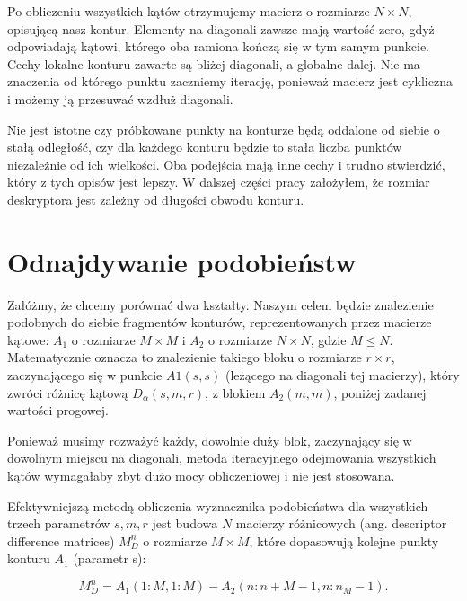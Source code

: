 Po obliczeniu wszystkich kątów otrzymujemy macierz o rozmiarze $N \times N$,
opisującą nasz kontur. Elementy na diagonali zawsze mają wartość zero, gdyż
odpowiadają kątowi, którego oba ramiona kończą się w tym samym punkcie. Cechy
lokalne konturu zawarte są bliżej diagonali, a globalne dalej. Nie ma znaczenia
od którego punktu zaczniemy iterację, ponieważ macierz jest cykliczna i możemy
ją przesuwać wzdłuż diagonali.

Nie jest istotne czy próbkowane punkty na konturze będą oddalone od siebie o
stałą odległość, czy dla każdego konturu będzie to stała liczba punktów
niezależnie od ich wielkości. Oba podejścia mają inne cechy i trudno
stwierdzić, który z tych opisów jest lepszy. W dalszej części pracy założyłem,
że rozmiar deskryptora jest zależny od długości obwodu konturu.


\section{Odnajdywanie podobieństw}

Załóżmy, że chcemy porównać dwa kształty. Naszym celem będzie znalezienie
podobnych do siebie fragmentów konturów, reprezentowanych przez macierze
kątowe: $A_{1}$ o rozmiarze $M \times M$ i $A_{2}$ o rozmiarze $N \times N$,
gdzie $M \leq N$.  Matematycznie oznacza to znalezienie takiego bloku o
rozmiarze $r \times r$, zaczynającego się w punkcie $A1(s,s)$ (leżącego na
diagonali tej macierzy), który zwróci różnicę kątową $D_{\alpha}(s,m,r)$, z
blokiem $A_{2}(m,m)$, poniżej zadanej wartości progowej. 


Ponieważ musimy rozważyć każdy, dowolnie duży blok, zaczynający się w dowolnym
miejscu na diagonali, metoda iteracyjnego odejmowania wszystkich kątów
wymagałaby zbyt dużo mocy obliczeniowej i nie jest stosowana.

Efektywniejszą metodą obliczenia wyznacznika podobieństwa dla wszystkich trzech
parametrów $s,m,r$ jest budowa $N$ macierzy różnicowych (ang. descriptor
difference matrices) $M_{D}^{n}$ o rozmiarze $M \times M$, które dopasowują
kolejne punkty konturu $A_{1}$ (parametr s):

\begin{equation}
  M_{D}^{n} = A_{1}(1: M, 1: M) - A_{2}(n: n+M-1, n:n_M-1).
\end{equation}

